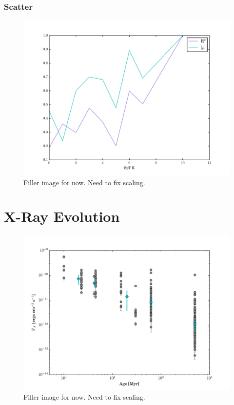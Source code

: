 \documentclass[twocolumn]{aastex62}
\begin{document}
\subsubsection{Scatter}

\begin{figure}[h]
\includegraphics[width=\linewidth]{R2_vs_spt.pdf}
\caption{Filler image for now. Need to fix scaling. \label{fig:r2_vs_spt}}
\end{figure}

\section{X-Ray Evolution}

\begin{figure}[h]
\includegraphics[width=\linewidth]{xray_evolution.pdf}
\caption{Filler image for now. Need to fix scaling. \label{fig:xray_evolution}}
\end{figure}
\end{document}
